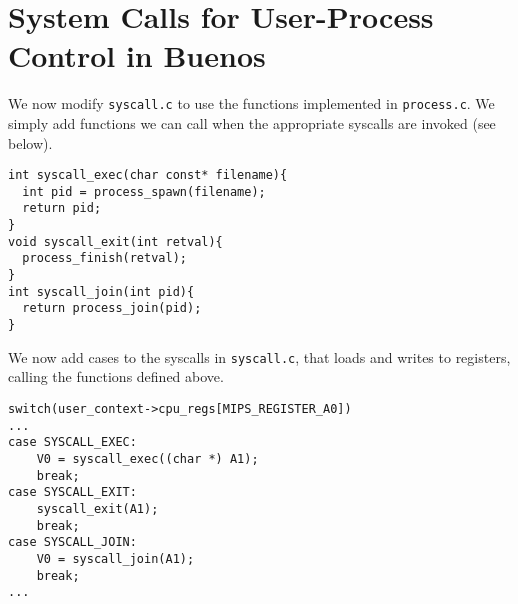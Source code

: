 \documentclass[a4paper,12pt]{article}
\begin{document}
\section{System Calls for User-Process Control in Buenos}
We now modify \texttt{syscall.c} to use the functions implemented in \texttt{process.c}. We simply add functions we can call when the appropriate syscalls are invoked (see below).
\begin{lstlisting}
int syscall_exec(char const* filename){
  int pid = process_spawn(filename);
  return pid;
}
void syscall_exit(int retval){
  process_finish(retval);
}
int syscall_join(int pid){
  return process_join(pid);
}
\end{lstlisting}

We now add cases to the syscalls in \texttt{syscall.c}, that loads and writes to registers, calling the functions defined above.
\begin{lstlisting}
switch(user_context->cpu_regs[MIPS_REGISTER_A0])
...
case SYSCALL_EXEC:
    V0 = syscall_exec((char *) A1);
    break;
case SYSCALL_EXIT:
    syscall_exit(A1);
    break;
case SYSCALL_JOIN:
    V0 = syscall_join(A1);
    break;
...
\end{lstlisting}
\end{document}
